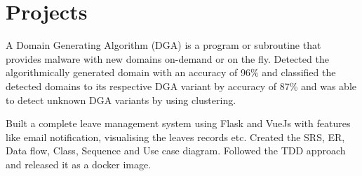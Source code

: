 \documentclass[]{hieudo-build}
\begin{document}
\begin{minipage}[t]{0.65\textwidth}
\sectionsep

\section{Projects}
\descript{}
A Domain Generating Algorithm (DGA) is a program or subroutine that provides malware with new domains on-demand or on the ﬂy. Detected the algorithmically generated domain with an accuracy of 96\% and classified the detected domains to its respective DGA variant by accuracy of 87\% and was able to detect unknown DGA variants by using clustering.
\sectionsep

\descript{}
Built a complete leave management system using Flask and VueJs with features like email notification, visualising the leaves records etc. Created the SRS, ER, Data flow, Class, Sequence and Use case diagram. Followed the TDD approach and released it as a docker image.

\sectionsep 

\sectionsep 

\end{minipage} 
\end{document}
